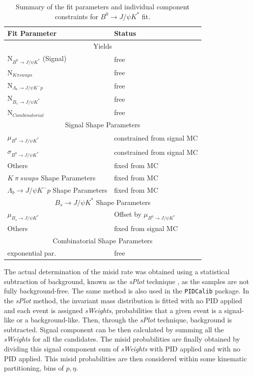 \begin{table}[h]
\centering
\begin{tabular}{ l  l   }
Fit Parameter & Status  \\ \hline
	\multicolumn{2}{c}{Yields} \\ \hline
N$_{B^{0} \rightarrow J/\psi K^{*}}$ (Signal)  &  free \\
N$_{K \pi swaps}$ & free\\
N$_{\Lambda_{b} \rightarrow J/\psi K^{-} p}$ & free\\
N$_{B_{s} \rightarrow J/\psi K^{*}}$ & free \\
N$_{Combinatorial}$ & free\\
\hline
	\multicolumn{2}{c}{Signal Shape Parameters} \\
\hline
$\mu_{B^{0} \rightarrow J/\psi K^{*}}$ & constrained from signal MC\\
$\sigma_{B^{0} \rightarrow J/\psi K^{*}}$ & constrained from signal MC\\
Others & fixed from MC\\
\hline
$K\ \pi\ swaps$ Shape Parameters & fixed from MC \\
\hline
$\Lambda_{b} \rightarrow J/\psi K^{-} p$ Shape Parameters & fixed from MC \\
\hline
	\multicolumn{2}{c}{${B_{s} \rightarrow J/\psi K^{*}}$ Shape Parameters} \\
$\mu_{B_{s} \rightarrow J/\psi K^{*}}$ & Offset by $\mu_{B^{0} \rightarrow J/\psi K^{*}}$ \\
Others & fixed from signal MC \\
\hline
	\multicolumn{2}{c}{Combinatorial Shape Parameters}  \\
\hline
exponential par.  & free\\
\hline
\end{tabular}
\caption{Summary of the fit parameters and individual component constraints for $B^{0} \rightarrow J/\psi K^{*}$ fit.}
\label{tab:floatingparsummarylol}
\end{table}





\color{red}
The actual determination of the misid rate was obtained using a statistical subtraction of background, known as the \textit{sPlot} technique \cite{sPlot}, as the samples are not fully background-free. The same method is also used in the \texttt{PIDCalib} package. In the \textit{sPlot} method, the invariant mass distribution is fitted with no \gls{PID} applied and each event is assigned \textit{sWeights}, probabilities that a given event is a signal-like or a background-like. Then, through the \textit{sPlot} technique, background is subtracted. Signal component can be then calculated by summing all the \textit{sWeights} for all the candidates. The misid probabilities are finally obtained by dividing this signal component sum of \textit{sWeights} with \gls{PID} applied and with no \gls{PID} applied. This misid probabilities are then considered within some kinematic partitioning, bins of $p,\eta$. 

